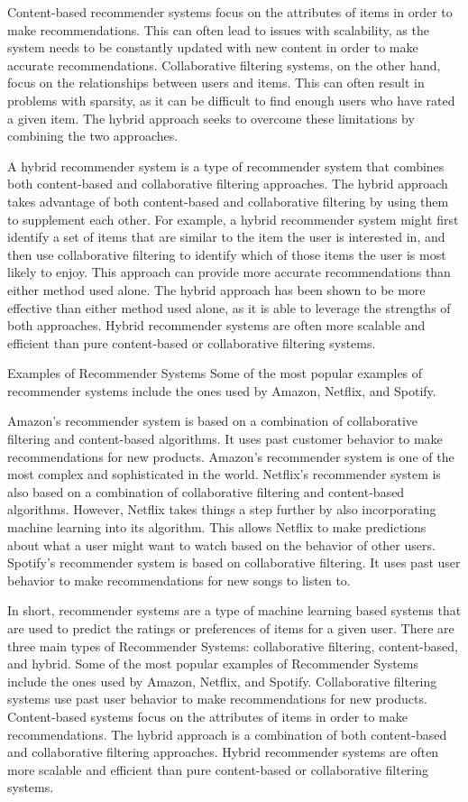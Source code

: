 \documentclass[11pt]{article}
\begin{document}
Content-based recommender systems focus on the attributes of items in order to make recommendations. This can often lead to issues with scalability, as the system needs to be constantly updated with new content in order to make accurate recommendations. Collaborative filtering systems, on the other hand, focus on the relationships between users and items. This can often result in problems with sparsity, as it can be difficult to find enough users who have rated a given item. The hybrid approach seeks to overcome these limitations by combining the two approaches. 

A hybrid recommender system is a type of recommender system that combines both content-based and collaborative filtering approaches. The hybrid approach takes advantage of both content-based and collaborative filtering by using them to supplement each other. For example, a hybrid recommender system might first identify a set of items that are similar to the item the user is interested in, and then use collaborative filtering to identify which of those items the user is most likely to enjoy. This approach can provide more accurate recommendations than either method used alone. The hybrid approach has been shown to be more effective than either method used alone, as it is able to leverage the strengths of both approaches. Hybrid recommender systems are often more scalable and efficient than pure content-based or collaborative filtering systems.

Examples of Recommender Systems
Some of the most popular examples of recommender systems include the ones used by Amazon, Netflix, and Spotify.

Amazon’s recommender system is based on a combination of collaborative filtering and content-based algorithms. It uses past customer behavior to make recommendations for new products. Amazon’s recommender system is one of the most complex and sophisticated in the world.
Netflix’s recommender system is also based on a combination of collaborative filtering and content-based algorithms. However, Netflix takes things a step further by also incorporating machine learning into its algorithm. This allows Netflix to make predictions about what a user might want to watch based on the behavior of other users.
Spotify’s recommender system is based on collaborative filtering. It uses past user behavior to make recommendations for new songs to listen to.


In short, recommender systems are a type of machine learning based systems that are used to predict the ratings or preferences of items for a given user. There are three main types of Recommender Systems: collaborative filtering, content-based, and hybrid. Some of the most popular examples of Recommender Systems include the ones used by Amazon, Netflix, and Spotify. Collaborative filtering systems use past user behavior to make recommendations for new products. Content-based systems focus on the attributes of items in order to make recommendations. The hybrid approach is a combination of both content-based and collaborative filtering approaches. Hybrid recommender systems are often more scalable and efficient than pure content-based or collaborative filtering systems. 
\end{document}
